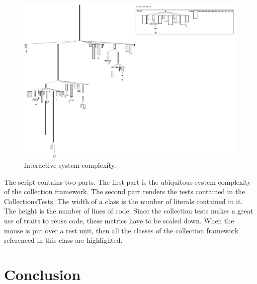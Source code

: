 \documentclass[a4paper,10pt,twoside]{book}
\begin{document}
\begin{figure}[htbp]
\centerline{\includegraphics[width=\linewidth]{testCoverage.png}}
\caption{Interactive system complexity.}
\label{fig:interactiveTestCoverage}
\end{figure}


The script contains two parts. The first part is the ubiquitous system complexity of the collection framework.  The second part renders the tests contained in the CollectionsTests. The width of a class is the number of literals contained in it. The height is the number of lines of code. Since the collection tests makes a great use of traits to reuse code, these metrics have to be scaled down. When the mouse is put over a test unit, then all the classes of the collection framework referenced in this class are highlighted. 


\section{Conclusion}
\end{document}
